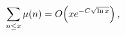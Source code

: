 \[\sum_{n\leq x}\mathop{\mu\/}\nolimits\!\left(n\right)=\mathop{O\/}\nolimits\!%
\left(xe^{-C\sqrt{\mathop{\ln\/}\nolimits x}}\right),\]